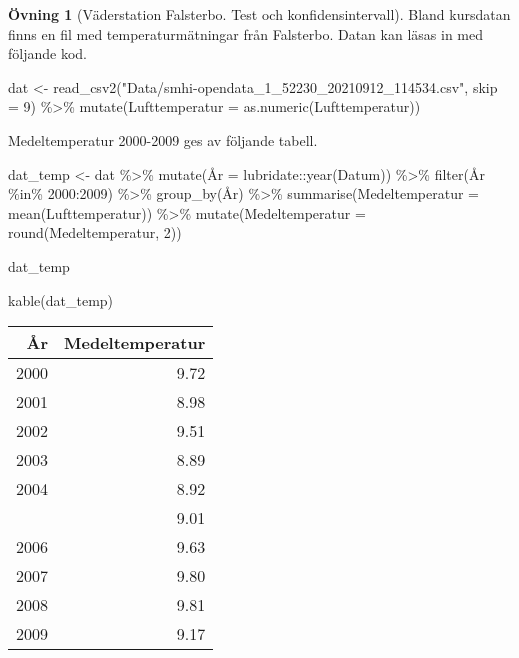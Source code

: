 \documentclass[
]{book}
\newenvironment{Shaded}{\begin{snugshade}}{\end{snugshade}}
\newcommand{\AttributeTok}[1]{\textcolor[rgb]{0.77,0.63,0.00}{#1}}
\newcommand{\DecValTok}[1]{\textcolor[rgb]{0.00,0.00,0.81}{#1}}
\newcommand{\FunctionTok}[1]{\textcolor[rgb]{0.00,0.00,0.00}{#1}}
\newcommand{\NormalTok}[1]{#1}
\newcommand{\OtherTok}[1]{\textcolor[rgb]{0.56,0.35,0.01}{#1}}
\newcommand{\SpecialCharTok}[1]{\textcolor[rgb]{0.00,0.00,0.00}{#1}}
\newcommand{\StringTok}[1]{\textcolor[rgb]{0.31,0.60,0.02}{#1}}
\theoremstyle{definition}
\theoremstyle{definition}
\theoremstyle{definition}
\newtheorem{exercise}{Övning}[chapter]
\theoremstyle{definition}
\theoremstyle{remark}
\begin{document}
\begin{exercise}[Väderstation Falsterbo. Test och konfidensintervall]
Bland kursdatan finns en fil med temperaturmätningar från Falsterbo. Datan kan läsas in med följande kod.

\begin{Shaded}
\begin{Highlighting}[]
\NormalTok{dat }\OtherTok{\textless{}{-}} \FunctionTok{read\_csv2}\NormalTok{(}\StringTok{"Data/smhi{-}opendata\_1\_52230\_20210912\_114534.csv"}\NormalTok{, }\AttributeTok{skip =} \DecValTok{9}\NormalTok{) }\SpecialCharTok{\%\textgreater{}\%} 
  \FunctionTok{mutate}\NormalTok{(}\AttributeTok{Lufttemperatur =} \FunctionTok{as.numeric}\NormalTok{(Lufttemperatur))}
\end{Highlighting}
\end{Shaded}

Medeltemperatur 2000-2009 ges av följande tabell.

\begin{Shaded}
\begin{Highlighting}[]
\NormalTok{dat\_temp }\OtherTok{\textless{}{-}}\NormalTok{ dat }\SpecialCharTok{\%\textgreater{}\%} 
  \FunctionTok{mutate}\NormalTok{(Å}\AttributeTok{r =}\NormalTok{ lubridate}\SpecialCharTok{::}\FunctionTok{year}\NormalTok{(Datum)) }\SpecialCharTok{\%\textgreater{}\%} 
  \FunctionTok{filter}\NormalTok{(År }\SpecialCharTok{\%in\%} \DecValTok{2000}\SpecialCharTok{:}\DecValTok{2009}\NormalTok{) }\SpecialCharTok{\%\textgreater{}\%} 
  \FunctionTok{group\_by}\NormalTok{(År) }\SpecialCharTok{\%\textgreater{}\%} 
  \FunctionTok{summarise}\NormalTok{(}\AttributeTok{Medeltemperatur =} \FunctionTok{mean}\NormalTok{(Lufttemperatur)) }\SpecialCharTok{\%\textgreater{}\%} 
  \FunctionTok{mutate}\NormalTok{(}\AttributeTok{Medeltemperatur =} \FunctionTok{round}\NormalTok{(Medeltemperatur, }\DecValTok{2}\NormalTok{))}

\NormalTok{dat\_temp}
\end{Highlighting}
\end{Shaded}

\begin{Shaded}
\begin{Highlighting}[]
\FunctionTok{kable}\NormalTok{(dat\_temp)}
\end{Highlighting}
\end{Shaded}

\begin{table}
\centering
\begin{tabular}[t]{rr}
\toprule
År & Medeltemperatur\\
\midrule
2000 & 9.72\\
2001 & 8.98\\
2002 & 9.51\\
2003 & 8.89\\
2004 & 8.92\\
\addlinespace
2005 & 9.01\\
2006 & 9.63\\
2007 & 9.80\\
2008 & 9.81\\
2009 & 9.17\\
\bottomrule
\end{tabular}
\end{table}


\end{exercise}
\end{document}

